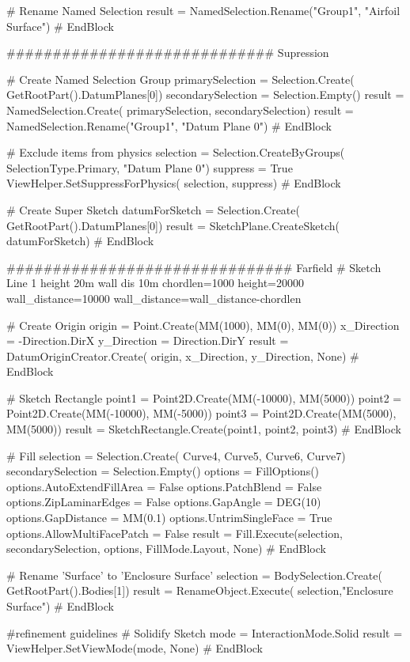 # Rename Named Selection
result = NamedSelection.Rename("Group1", "Airfoil Surface")
# EndBlock


############################# Supression


# Create Named Selection Group
primarySelection = Selection.Create(
    GetRootPart().DatumPlanes[0])
secondarySelection = Selection.Empty()
result = NamedSelection.Create(
    primarySelection, secondarySelection)
result = NamedSelection.Rename("Group1", "Datum Plane 0")
# EndBlock




# Exclude items from physics
selection = Selection.CreateByGroups(
    SelectionType.Primary, "Datum Plane 0")
suppress = True
ViewHelper.SetSuppressForPhysics(
    selection, suppress)
# EndBlock


# Create Super Sketch
datumForSketch = Selection.Create(
    GetRootPart().DatumPlanes[0])
result = SketchPlane.CreateSketch(
    datumForSketch)
# EndBlock


############################### Farfield
# Sketch Line 1 height 20m wall dis 10m
chordlen=1000
height=20000
wall_distance=10000
wall_distance=wall_distance-chordlen


# Create Origin
origin = Point.Create(MM(1000), MM(0), MM(0))
x_Direction = -Direction.DirX
y_Direction = Direction.DirY
result = DatumOriginCreator.Create(
    origin, x_Direction, y_Direction, None)
# EndBlock


# Sketch Rectangle
point1 = Point2D.Create(MM(-10000), MM(5000))
point2 = Point2D.Create(MM(-10000), MM(-5000))
point3 = Point2D.Create(MM(5000), MM(5000))
result = SketchRectangle.Create(point1, point2, point3)
# EndBlock


# Fill 
selection = Selection.Create(
    Curve4, Curve5, Curve6, Curve7)
secondarySelection = Selection.Empty()
options = FillOptions()
options.AutoExtendFillArea = False
options.PatchBlend = False
options.ZipLaminarEdges = False
options.GapAngle = DEG(10)
options.GapDistance = MM(0.1)
options.UntrimSingleFace = True
options.AllowMultiFacePatch = False
result = Fill.Execute(selection, 
                      secondarySelection, 
                      options, FillMode.Layout, None)
# EndBlock


# Rename 'Surface' to 'Enclosure Surface'
selection = BodySelection.Create(
    GetRootPart().Bodies[1])
result = RenameObject.Execute(
    selection,"Enclosure Surface")
# EndBlock


#refinement guidelines
# Solidify Sketch
mode = InteractionMode.Solid
result = ViewHelper.SetViewMode(mode, None)
# EndBlock


